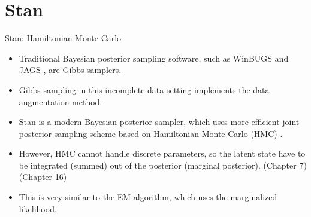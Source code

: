\documentclass[dvipdfmx,bigger,aspectratio=169]{beamer}
\begin{document}
\section{Stan}
\label{sec:org4a6e5a6}
\begin{frame}[label={sec:org0fa8288}]{}
\begin{center}
\end{center}
\end{frame}

\begin{frame}[label={sec:org7e67301}]{Stan: Hamiltonian Monte Carlo}
\begin{itemize}
\item Traditional Bayesian posterior sampling software, such as WinBUGS \cite{lunnWinBUGSBayesianModelling2000} and JAGS \cite{plummerJAGSProgramAnalysis2003}, are Gibbs samplers.
\item Gibbs sampling in this incomplete-data setting implements the data augmentation method.
\item Stan \cite{carpenterStanProbabilisticProgramming2017} is a modern Bayesian posterior sampler, which uses more efficient joint posterior sampling scheme based on Hamiltonian Monte Carlo (HMC) \cite{betancourtConceptualIntroductionHamiltonian2017}.
\item However, HMC cannot handle discrete parameters, so the latent state have to be integrated (summed) out of the posterior (marginal posterior). \cite{standevelopmentteamStanUserGuide2019} (Chapter 7) \cite{lambertStudentGuideBayesian2018} (Chapter 16)
\item This is very similar to the EM algorithm, which uses the marginalized likelihood.
\end{itemize}
\end{frame}
\end{document}
